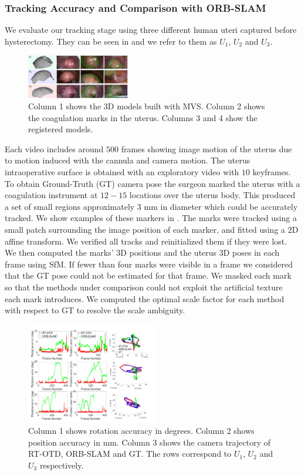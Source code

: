 \subsubsection{Tracking Accuracy and Comparison with ORB-SLAM}
We evaluate our tracking stage using three different human uteri captured before hysterectomy. They can be seen in  and we refer to them as $U_1$, $U_2$ and $U_3$.
\begin{figure}[htbp]
  \centering
  \includegraphics[width=0.4\textwidth]{./figs/snapshotsCompressed.pdf}
\caption{Column 1 shows the 3D models built with MVS. Column 2 shows the coagulation marks in the uterus. Columns 3 and 4 show the registered models.}
\label{fig:hister}
\end{figure}
 Each video includes around $500$ frames showing image motion of the uterus due to motion induced with the cannula and camera motion. The uterus intraoperative surface is obtained with an exploratory video with $10$ keyframes. To obtain Ground-Truth (GT) camera pose the surgeon marked the uterus with a coagulation instrument at $12-15$  locations over the uterus body. This produced a set of small regions approximately $3$ mm in diameter which could be accurately tracked. We show examples of these markers in . The marks were tracked using a small patch surrounding the image position of each marker, and fitted using a 2D affine transform. We verified all tracks and reinitialized them if they were lost. We then computed the marks’ 3D positions and the uterus 3D poses in each frame using SfM. If fewer than four marks were visible in a frame we considered that the GT pose could not be estimated for that frame. We masked each mark so that the methods under comparison could not exploit the artificial texture each mark introduces. We computed the optimal scale factor for each method with respect to GT to resolve the scale ambiguity.
\begin{figure}[htbp]
  \centering
  \includegraphics[width=0.51\textwidth]{./figs/Accuracy_errors.pdf}
\caption{Column 1 shows rotation accuracy in degrees. Column 2 shows position accuracy in mm. Column 3 shows the camera trajectory of RT-OTD, ORB-SLAM and GT. The rows correspond to $U_1$, $U_2$ and $U_3$ respectively.}
\label{fig:hister_results}
\end{figure}
